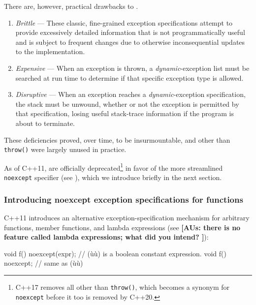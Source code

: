 \noindent There are, however, practical drawbacks to .
\begin{enumerate}
\item{\emph{Brittle} — These classic, fine-grained exception specifications attempt to provide excessively detailed information that is not programmatically useful and is subject to frequent changes due to otherwise inconsequential updates to the implementation.}
\item{\emph{Expensive} — When an exception is thrown, a \emph{dynamic}-exception list must be searched at run time to determine if that specific exception type is allowed.}
\item{\emph{Disruptive} — When an exception reaches a \emph{dynamic}-exception specification, the stack must be unwound, whether or not the exception is permitted by that specification, losing useful stack-trace information if the program is about to terminate.}
\end{enumerate}
These deficiencies proved, over time, to be insurmountable, and
 other than \lstinline!throw()!
were largely unused in practice.

As of C++11,  are officially
deprecated{\cprotect\footnote{C++17 removes all  other than \lstinline!throw()!, which becomes a
  synonym for \lstinline!noexcept! before it too is removed by C++20.}} in
favor of the more streamlined \lstinline!noexcept! specifier (see ), which we introduce briefly in the next section.

\subsubsection[Introducing \lstinline!noexcept! exception specifications for functions]{Introducing {\SubsubsecCode noexcept} exception specifications for functions}\label{introducing-noexcept-exception-specifications-for-functions}

C++11 introduces an alternative exception-specification mechanism for
arbitrary functions, member functions, and lambda expressions (see
\featureref{}{} \textbf{[AUs: there is no feature called lambda expressions; what did you intend? ]}):

\begin{emcppslisting}
void f() noexcept(expr);  // (ù{}ù) is a boolean constant expression.
void f() noexcept;        // same as (ù{}ù)
\end{emcppslisting}
    

